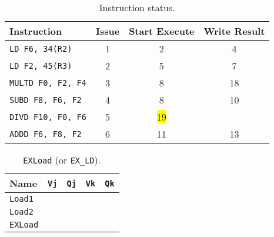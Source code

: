 \begin{enumerate}
    \begin{table}[!htp]
        \centering
        \begin{tabular}{@{} l | c c c @{}}
            \toprule
            Instruction                 & Issue & Start Execute & Write Result  \\
            \midrule
            \texttt{LD    F6, 34(R2)}   & 1     & 2             & 4             \\ [.3em]
            \texttt{LD    F2, 45(R3)}   & 2     & 5             & 7             \\ [.3em]
            \texttt{MULTD F0, F2, F4}   & 3     & 8             & 18            \\ [.3em]
            \texttt{SUBD  F8, F6, F2}   & 4     & 8             & 10            \\ [.3em]
            \texttt{DIVD  F10, F0, F6}  & 5     & \hl{19}       &               \\ [.3em]
            \texttt{ADDD  F6, F8, F2}   & 6     & 11            & 13            \\
            \bottomrule
        \end{tabular}
        \caption*{Instruction status.}
    \end{table}

    \begin{table}[!htp]
        \centering
        \begin{tabular}{@{} l | c c c c @{}}
            \toprule
            Name            & \texttt{Vj}   & \texttt{Qj}   & \texttt{Vk}           & \texttt{Qk}   \\
            \midrule
            \texttt{Load1}  &               &               &                       &               \\ [.3em]
            \texttt{Load2}  &               &               &                       &               \\
            \cmidrule{1-5}
            \texttt{EXLoad} &               &               &                       &               \\
            \bottomrule
        \end{tabular}
        \caption*{\texttt{EXLoad} (or \texttt{EX\_LD}).}
    \end{table}


\end{enumerate}
